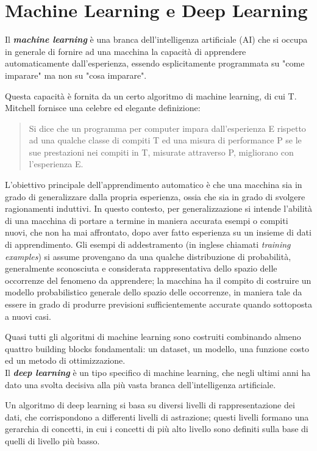 \section{Machine Learning e Deep Learning}
\label{machineLearning}
Il \textbf{\textit{machine learning}} è una branca dell'intelligenza artificiale (AI) che si occupa in generale di fornire ad una macchina la capacità di apprendere automaticamente dall'esperienza, essendo esplicitamente programmata su "come imparare" ma non su "cosa imparare".

Questa capacità è fornita da un certo algoritmo di machine learning, di cui T. Mitchell fornisce una celebre ed elegante definizione:
\begin{quote}
Si dice che un programma per computer impara dall’esperienza E rispetto ad una qualche classe di compiti T ed una misura di performance P se le sue prestazioni nei compiti in T, misurate attraverso P, migliorano con l’esperienza E.
\end{quote}

\noindent L'obiettivo principale dell'apprendimento automatico è che una macchina sia in grado di generalizzare dalla propria esperienza\cite{bishop}, ossia che sia in grado di svolgere ragionamenti induttivi. In questo contesto, per generalizzazione si intende l'abilità di una macchina di portare a termine in maniera accurata esempi o compiti nuovi, che non ha mai affrontato, dopo aver fatto esperienza su un insieme di dati di apprendimento.
Gli esempi di addestramento (in inglese chiamati \textit{training examples}) si assume provengano da una qualche distribuzione di probabilità, generalmente sconosciuta e considerata rappresentativa dello spazio delle occorrenze del fenomeno da apprendere; la macchina ha il compito di costruire un modello probabilistico generale dello spazio delle occorrenze, in maniera tale da essere in grado di produrre previsioni sufficientemente accurate quando sottoposta a nuovi casi.

Quasi tutti gli algoritmi di machine learning sono costruiti combinando almeno quattro
building blocks fondamentali: un dataset, un modello, una funzione costo ed un
metodo di ottimizzazione.\\

Il \textbf{\textit{deep learning}} è un tipo specifico di machine learning, che negli ultimi anni ha dato una svolta decisiva alla più vasta branca dell’intelligenza artificiale.

Un algoritmo di deep learning si basa su diversi livelli di rappresentazione dei dati, che corrispondono a differenti livelli di astrazione; questi livelli formano una gerarchia di concetti, in cui i concetti di più alto livello sono definiti sulla base di quelli di livello più basso.

